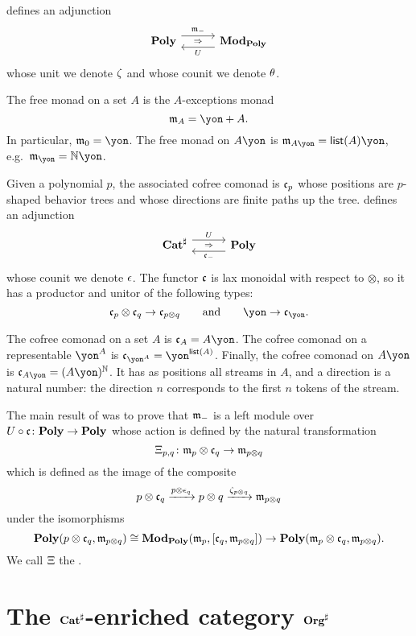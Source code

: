 \cite[Theorem 2.10]{libkind2024pattern} defines an adjunction
\[
    \adj{\poly}{\free_-}{U}{\modpoly}
\]
whose unit we denote $\zeta$ and whose counit we denote $\theta$.

\begin{example}
The free monad on a set $A$ is the $A$-exceptions monad
\[\free_A=\yon+A.\]
In particular, $\free_0=\yon$. The free monad on $A\yon$ is $\free_{A\yon}=\List(A)\yon$, e.g.\ $\free_\yon=\nn\yon$.
\end{example}

Given a polynomial $p$, the associated cofree comonad is $\mathfrak{c}_p$ whose positions are $p$-shaped behavior trees and whose directions are finite paths up the tree. 
\cite[Theorem 3.2]{libkind2024pattern} defines an adjunction 
\[
    \adj{\catsharp}{U}{\cofree_-}{\poly}
\]
whose counit we denote $\epsilon$. The functor $\mathfrak{c}$ is lax monoidal with respect to $\otimes$, so it has a productor and unitor of the following types:
\begin{equation}\label{eqn.cofree_lax_monoidal}
\cofree_p\otimes\cofree_q\to\cofree_{p\otimes q}\qqand\yon\to\cofree_\yon.
\end{equation}

\begin{example}
The cofree comonad on a set $A$ is $\cofree_A=A\yon$. The cofree comonad on a representable $\yon^A$ is $\cofree_{\yon^A}=\yon^{\List(A)}$. Finally, the cofree comonad on $A\yon$ is $\cofree_{A\yon}=(A\yon)^\nn$. It has as positions all streams in $A$, and a direction is a natural number: the direction $n$ corresponds to the first $n$ tokens of the stream.

\end{example}

The main result of \cite[Theorem 3.4]{libkind2024pattern} was to prove that $\mathfrak{m}_-$ is a left module over $U \circ  \mathfrak{c} \colon \mathbf{Poly} \to \mathbf{Poly}$ whose action is defined by the natural transformation 
\[
    \Xi_{p,q}\colon \mathfrak{m}_p \otimes \mathfrak{c}_q \to \mathfrak{m}_{p \otimes q}
\] which is defined as the image of the composite
\[
    p \otimes \mathfrak{c}_q \xrightarrow{p \otimes \epsilon_q} p \otimes q \xrightarrow{\zeta_{p \otimes q}} \mathfrak{m}_{p \otimes q}
\] under the isomorphisms
\[
    \mathbf{Poly}(p \otimes \mathfrak{c}_q, \mathfrak{m}_{p\otimes q})  \cong \mathbf{Mod}_{\mathbf{Poly}}(\mathfrak{m}_p, [\mathfrak{c}_q, \mathfrak{m}_{p\otimes q}]) \to \mathbf{Poly}(\mathfrak{m}_p \otimes \mathfrak{c}_q, \mathfrak{m}_{p \otimes q}).
\] We call $\Xi$ the .



\section{The $\mathbf{Cat}^\sharp$-enriched category $\mathbf{Org}^\sharp$}\label{sec.orgsharp}

